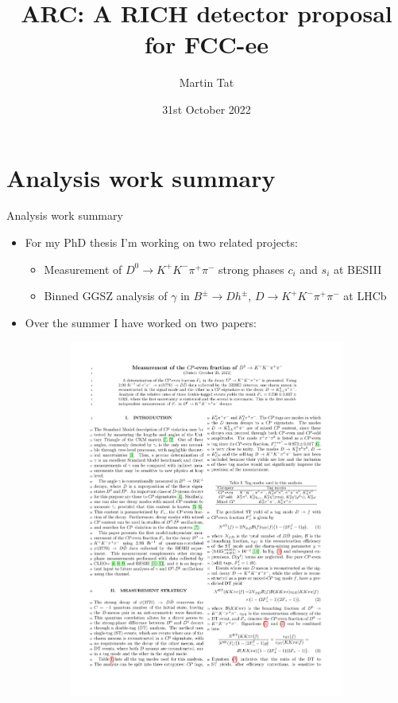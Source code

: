 \documentclass{beamer}
\title[ARC]{ARC: A RICH detector proposal for FCC-ee}
\author{Martin Tat}
\institute{Oxford LHCb}
\date{31st October 2022}
\begin{document}
\begin{frame}
  \titlepage
\end{frame}


\section{Analysis work summary}

\begin{frame}{Analysis work summary}
  \begin{itemize}
    \setlength\itemsep{0.5em}
    \item{For my PhD thesis I'm working on two related projects:}
    \begin{itemize}
      \setlength\itemsep{0.5em}
      \item{Measurement of $D^0\to K^+K^-\pi^+\pi^-$ strong phases $c_i$ and $s_i$ at BESIII}
      \item{Binned GGSZ analysis of $\gamma$ in $B^\pm\to Dh^\pm$, $D\to K^+K^-\pi^+\pi^-$ at LHCb}
    \end{itemize}
    \item{Over the summer I have worked on two papers:}
  \end{itemize}
  \begin{figure}
    \begin{subfigure}{0.35\textwidth}
      \includegraphics[width = 1.0\textwidth, page = 1]{Plots/BESIII_PAPER_DocDB_1111_NoAuthorList.pdf}

\end{subfigure}
\end{figure}
\end{frame}
\end{document}
